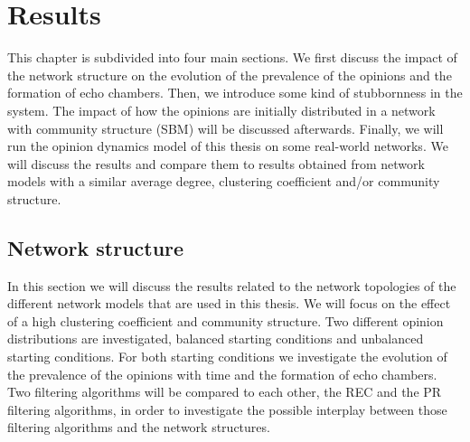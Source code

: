 \documentclass[11 pt , letterpaper , twoside , openright]{book}
\begin{document}
\chapter{Results}

This chapter is subdivided into four main sections. We first discuss the impact of the network structure on the evolution of the prevalence of the opinions and the formation of echo chambers. Then, we introduce some kind of stubbornness in the system. The impact of how the opinions are initially distributed in a network with community structure (SBM) will be discussed afterwards. Finally, we will run the opinion dynamics model of this thesis on some real-world networks. We will discuss the results and compare them to results obtained from network models with a similar average degree, clustering coefficient and/or community structure.

\section{Network structure}\label{netw_struc}

In this section we will discuss the results related to the network topologies of the different network models that are used in this thesis. We will focus on the effect of a high clustering coefficient and community structure. Two different opinion distributions are investigated, balanced starting conditions and unbalanced starting conditions. For both starting conditions we investigate the evolution of the prevalence of the opinions with time and the formation of echo chambers. Two filtering algorithms will be compared to each other, the REC and the PR filtering algorithms, in order to investigate the possible interplay between those filtering algorithms and the network structures.\\
\end{document}
